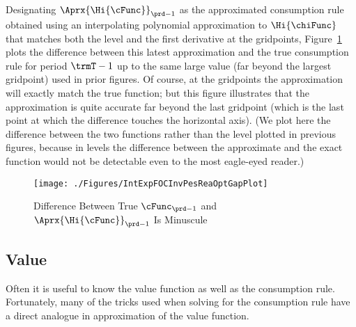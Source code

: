 Designating $\Aprx{\Hi{\cFunc}}_{\prd-1}$ as the approximated consumption rule obtained using an interpolating polynomial approximation to $\Hi{\chiFunc}$ that matches both the level and the first derivative at the gridpoints, Figure~\ref{fig:IntExpFOCInvPesReaOptGapPlot} plots the difference between this latest approximation and the true consumption rule for period $\trmT-1$ up to the same large value (far beyond the largest gridpoint) used in prior figures.  Of course, at the gridpoints the approximation will exactly match the true function; but this figure illustrates that the approximation is quite accurate far beyond the last gridpoint (which is the last point at which the difference touches the horizontal axis).  (We plot here the difference between the two functions rather than the level plotted in previous figures, because in levels the difference between the approximate and the exact function would not be detectable even to the most eagle-eyed reader.)



\hypertarget{IntExpFOCInvPesReaOptGapPlot}{}
\begin{figure}
  \texttt{[image: ./Figures/IntExpFOCInvPesReaOptGapPlot]}
  \caption{Difference Between True $\cFunc_{\prd-1}$ and $\Aprx{\Hi{\cFunc}}_{\prd-1}$ Is Minuscule}
  \label{fig:IntExpFOCInvPesReaOptGapPlot}
\end{figure}




\hypertarget{value}{}
\subsection{Value}


  Often it is useful to know the value function as well as the consumption rule.  Fortunately, many of the tricks used when solving for the consumption rule have a direct analogue in approximation of the value function.

